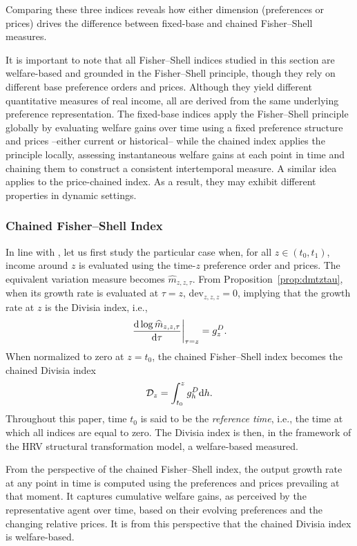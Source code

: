 \documentclass[12pt,a4paper]{article}
\begin{document}
\noindent Comparing these three indices reveals how either dimension (preferences or prices) drives the difference between fixed-base and chained Fisher–Shell measures.

\noindent It is important to note that all Fisher–Shell indices studied in this section are welfare-based and grounded in the Fisher–Shell principle, though they rely on different base preference orders and prices. Although they yield different quantitative measures of real income, all are derived from the same underlying preference representation. The fixed-base indices apply the Fisher–Shell principle globally by evaluating welfare gains over time using a fixed preference structure and prices --either current or historical-- while the chained index applies the principle locally, assessing instantaneous welfare gains at each point in time and chaining them to construct a consistent intertemporal measure. A similar idea applies to the price-chained %
index. As a result, they may exhibit different properties in dynamic settings. 

\subsubsection{Chained Fisher–Shell Index }\label{sec:chainedFS}
In line with \cite{duran_licandro_2024}, let us first study the particular case when, for all $z\in(t_0,t_1)$, income around $z$ is evaluated using the time-$z$ preference order and prices. The equivalent variation measure becomes $\widehat m_{z,z,\tau}$.
From Proposition~\ref{prop:dmtztau}, when its growth rate is evaluated at $\tau=z$, dev$_{z,z,z}=0$, implying that the growth rate at $z$ is the Divisia index, i.e., 
\[
\left. \frac{\textnormal{d} \log \widehat{m}_{z,z,\tau}}{\textnormal{d}\tau} \right|_{\tau=z} = g^D_z .
\]
When normalized to zero at $z=t_0$, the chained Fisher–Shell index becomes the chained Divisia index
\[
{\cal D}_{z} = {\int_{t_0}^z g^{D}_h \text{d}h}.
\]
Throughout this paper, time \(t_0\) is said to be the {\it reference time}, i.e., the time at which all indices are equal to zero.
The Divisia index is then, in the framework of the HRV structural transformation model, a welfare-based measured. %

From the perspective of the chained Fisher–Shell index, the output growth rate at any point in time is computed using the preferences and prices prevailing at that moment.  
It captures cumulative welfare gains, as perceived by the representative agent over time, based on their evolving preferences and the changing relative prices.  
It is from this perspective that the chained Divisia index is welfare-based.  
\end{document}
